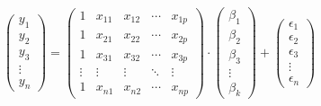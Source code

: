 \documentclass[12pt,]{article}
\begin{document}
\[
\begin{pmatrix}
    y_1 \\ y_2 \\ y_3 \\ \vdots \\ y_n 
 \end{pmatrix} = 
 \begin{pmatrix}
    1 & x_{11} & x_{12} & \cdots & x_{1p} \\
    1 & x_{21} & x_{22} & \cdots & x_{2p} \\
    1 & x_{31} & x_{32} & \cdots & x_{3p} \\
    \vdots  & \vdots  & \vdots & \ddots & \vdots \\
    1 & x_{n1} & x_{n2} & \cdots & x_{np}
 \end{pmatrix} \cdot
 \begin{pmatrix}
    \beta_1 \\ \beta_2 \\ \beta_3 \\ \vdots \\ \beta_k  
 \end{pmatrix} +
 \begin{pmatrix}
    \epsilon_1 \\ \epsilon_2 \\ \epsilon_3 \\ \vdots \\ \epsilon_n  
 \end{pmatrix}
\]
\end{document}
